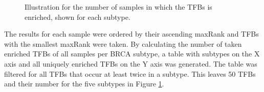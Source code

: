 \documentclass[pdftex,12pt,a4paper]{report}
\begin{document}
\begin{figure}[!ht]
\begin{center}
	\caption{Illustration for the number of samples in which the TFBs is enriched, shown for each subtype.}
	\label{lola_result}
\end{center}
\end{figure} 
The results for each sample were ordered by their ascending maxRank and TFBs with the smallest maxRank were taken. By calculating the number of taken enriched TFBs of all samples per BRCA subtype, a table with subtypes on the X axis and all uniquely enriched TFBs on the Y axis was generated. The table was filtered for all TFBs that occur at least twice in a subtype. This leaves 50 TFBs and their number for the five subtypes in Figure \ref{lola_result}.
\end{document}
